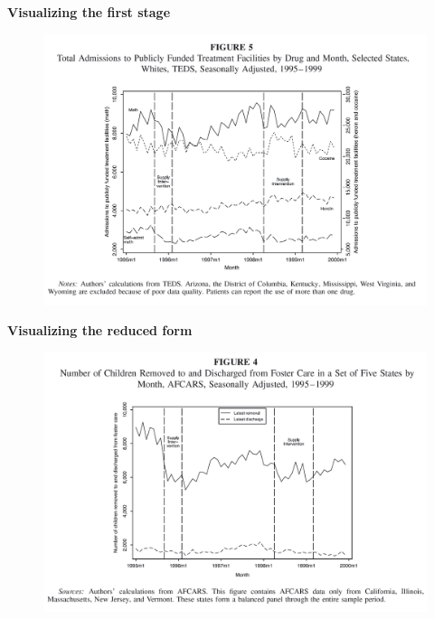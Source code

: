 \documentclass[notes=show]{beamer}
\begin{document}
\begin{frame}[plain]

	\begin{center}
	\textbf{Visualizing the first stage}
	\end{center}
	
	\begin{figure}
	\includegraphics[scale=0.15]{./lecture_includes/keith_3.png}
	\end{figure}
	
\end{frame}

\begin{frame}[plain]

	\begin{center}
	\textbf{Visualizing the reduced form}
	\end{center}
	
	\begin{figure}
	\includegraphics[scale=0.15]{./lecture_includes/keith_2.png}
	\end{figure}
	
\end{frame}
\end{document}
